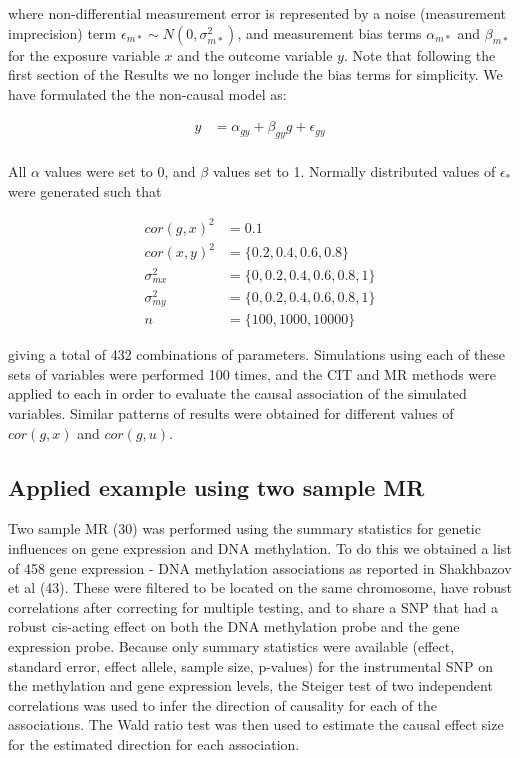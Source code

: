 \documentclass[]{article}
\begin{document}
where non-differential measurement error is represented by a noise
(measurement imprecision) term
\(\epsilon_{m*} \sim N(0, \sigma^2_{m*})\), and measurement bias terms
\(\alpha_{m*}\) and \(\beta_{m*}\) for the exposure variable \(x\) and
the outcome variable \(y\). Note that following the first section of the
Results we no longer include the bias terms for simplicity. We have
formulated the the non-causal model as:

\[
\begin{aligned}
y & = \alpha_{gy} + \beta_{gy} g + \epsilon_{gy} \\
\end{aligned}
\]

All \(\alpha\) values were set to 0, and \(\beta\) values set to 1.
Normally distributed values of \(\epsilon_*\) were generated such that

\[
\begin{aligned}
cor(g, x)^2 & = 0.1 \\
cor(x, y)^2 & = \{0.2, 0.4, 0.6, 0.8\} \\
\sigma^2_{mx} & = \{0, 0.2, 0.4, 0.6, 0.8, 1\} \\
\sigma^2_{my} & = \{0, 0.2, 0.4, 0.6, 0.8, 1\} \\
n & = \{100, 1000, 10000\}
\end{aligned}
\]

giving a total of 432 combinations of parameters. Simulations using each
of these sets of variables were performed 100 times, and the CIT and MR
methods were applied to each in order to evaluate the causal association
of the simulated variables. Similar patterns of results were obtained
for different values of \(cor(g, x)\) and \(cor(g, u)\).

\subsection{Applied example using two sample
MR}\label{applied-example-using-two-sample-mr}

Two sample MR (30) was performed using the summary statistics for
genetic influences on gene expression and DNA methylation. To do this we
obtained a list of 458 gene expression - DNA methylation associations as
reported in Shakhbazov et al (43). These were filtered to be located on
the same chromosome, have robust correlations after correcting for
multiple testing, and to share a SNP that had a robust cis-acting effect
on both the DNA methylation probe and the gene expression probe. Because
only summary statistics were available (effect, standard error, effect
allele, sample size, p-values) for the instrumental SNP on the
methylation and gene expression levels, the Steiger test of two
independent correlations was used to infer the direction of causality
for each of the associations. The Wald ratio test was then used to
estimate the causal effect size for the estimated direction for each
association.
\end{document}
